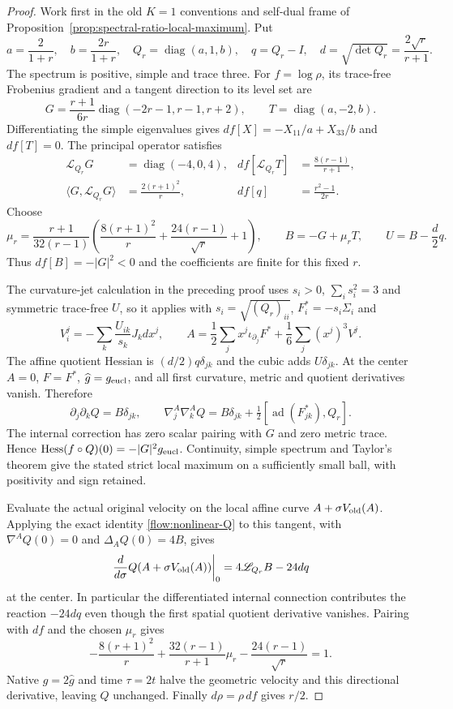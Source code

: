 \documentclass[11pt]{article}
\numberwithin{equation}{section}
\theoremstyle{definition}
\theoremstyle{remark}
\begin{document}
\begin{proof}
Work first in the old $K=1$ conventions and self-dual frame of
Proposition~\ref{prop:spectral-ratio-local-maximum}.
Put
\[
 a=\frac2{1+r},\quad b=\frac{2r}{1+r},\quad
 Q_r=\operatorname{diag}(a,1,b),\quad q=Q_r-I,\quad
 d=\sqrt{\det Q_r}=\frac{2\sqrt r}{r+1}.
\]
The spectrum is positive, simple and trace three.
For $f=\log\rho$, its trace-free Frobenius gradient and a
tangent direction to its level set are
\[
 G=\frac{r+1}{6r}\operatorname{diag}(-2r-1,r-1,r+2),
 \qquad T=\operatorname{diag}(a,-2,b).
\]
Differentiating the simple eigenvalues gives
$df[X]=-X_{11}/a+X_{33}/b$ and $df[T]=0$.
The principal operator satisfies
\[
 \begin{aligned}
 \mathscr L_{Q_r}G&=\operatorname{diag}(-4,0,4),&
 df[\mathscr L_{Q_r}T]&=\frac{8(r-1)}{r+1},\\
 \langle G,\mathscr L_{Q_r}G\rangle&=\frac{2(r+1)^2}{r},&
 df[q]&=\frac{r^2-1}{2r}.
 \end{aligned}
\]
Choose
\[
 \mu_r=\frac{r+1}{32(r-1)}
       \left(\frac{8(r+1)^2}{r}+\frac{24(r-1)}{\sqrt r}+1\right),
 \qquad B=-G+\mu_rT,\qquad U=B-\frac d2q.
\]
Thus $df[B]=-|G|^2<0$ and the coefficients are finite for
this fixed $r$.

The curvature-jet calculation in the preceding proof uses
$s_i>0$, $\sum_i s_i^2=3$ and symmetric trace-free $U$, so it applies with
$s_i=\sqrt{(Q_r)_{ii}}$, $F_i^*=-s_i\Sigma_i$ and
\[
 V_i^j=-\sum_k\frac{U_{ik}}{s_k}J_kdx^j,
 \qquad
 A=\frac12\sum_jx^j\iota_{\partial_j}F^*
                    +\frac16\sum_j(x^j)^3V^j.
\]
The affine quotient Hessian is $(d/2)q\delta_{jk}$ and the
cubic adds $U\delta_{jk}$. At the center $A=0$, $F=F^*$,
$\widehat g=g_{\rm eucl}$, and all first curvature, metric
and quotient derivatives vanish. Therefore
\[
 \partial_j\partial_kQ=B\delta_{jk},\qquad
 \nabla_j^A\nabla_k^AQ
 =B\delta_{jk}+\tfrac12[\operatorname{ad}(F^*_{jk}),Q_r].
\]
The internal correction has zero scalar pairing with $G$
and zero metric trace. Hence
$\operatorname{Hess}(f\circ Q)(0)=-|G|^2g_{\rm eucl}$.
Continuity, simple spectrum and Taylor's theorem give the
stated strict local maximum on a sufficiently small ball,
with positivity and sign retained.

Evaluate the actual original velocity on the local affine
curve $A+\sigma V_{\rm old}(A)$. Applying the exact identity
\eqref{flow:nonlinear-Q} to this tangent, with $\nabla^AQ(0)=0$
and $\Delta_AQ(0)=4B$, gives
\[
 \left.\frac{d}{d\sigma}Q(A+\sigma V_{\rm old}(A))\right|_0
       =4\mathscr L_{Q_r}B-24dq
\]
at the center. In particular the differentiated internal
connection contributes the reaction $-24dq$ even though
the first spatial quotient derivative vanishes. Pairing with
$df$ and the chosen $\mu_r$ gives
\[
 -\frac{8(r+1)^2}{r}
 +\frac{32(r-1)}{r+1}\mu_r-\frac{24(r-1)}{\sqrt r}=1.
\]
Native $g=2\widehat g$ and time $\tau=2t$ halve the
geometric velocity and this directional derivative, leaving
$Q$ unchanged. Finally $d\rho=\rho\,df$ gives $r/2$.
\end{proof}
\end{document}
